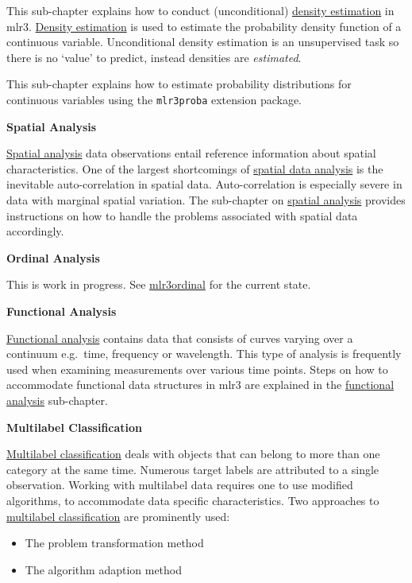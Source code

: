 \documentclass[]{scrbook}
\providecommand{\tightlist}{%
  \setlength{\itemsep}{0pt}\setlength{\parskip}{0pt}}
\begin{document}
This sub-chapter explains how to conduct (unconditional) \protect\hyperlink{density}{density estimation} in mlr3.
\protect\hyperlink{density}{Density estimation} is used to estimate the probability density function of a continuous variable. Unconditional density estimation is an unsupervised task so there is no `value' to predict, instead densities are \emph{estimated}.

This sub-chapter explains how to estimate probability distributions for continuous variables using the \texttt{mlr3proba} extension package.

\textbf{Spatial Analysis}

\protect\hyperlink{spatial}{Spatial analysis} data observations entail reference information about spatial characteristics.
One of the largest shortcomings of \protect\hyperlink{spatial}{spatial data analysis} is the inevitable auto-correlation in spatial data.
Auto-correlation is especially severe in data with marginal spatial variation.
The sub-chapter on \protect\hyperlink{spatial}{spatial analysis} provides instructions on how to handle the problems associated with spatial data accordingly.

\textbf{Ordinal Analysis}

This is work in progress.
See \href{https://github.com/mlr-org/mlr3ordinal}{mlr3ordinal} for the current state.

\textbf{Functional Analysis}

\protect\hyperlink{functional}{Functional analysis} contains data that consists of curves varying over a continuum e.g.~time, frequency or wavelength.
This type of analysis is frequently used when examining measurements over various time points.
Steps on how to accommodate functional data structures in mlr3 are explained in the \protect\hyperlink{functional}{functional analysis} sub-chapter.

\textbf{Multilabel Classification}

\protect\hyperlink{multilabel}{Multilabel classification} deals with objects that can belong to more than one category at the same time.
Numerous target labels are attributed to a single observation.
Working with multilabel data requires one to use modified algorithms, to accommodate data specific characteristics.
Two approaches to \protect\hyperlink{multilabel}{multilabel classification} are prominently used:

\begin{itemize}
\tightlist
\item
  The problem transformation method
\item
  The algorithm adaption method
\end{itemize}
\end{document}
